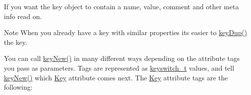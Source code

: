 \begin{DoxyCodeInclude}{0}
\DoxyCodeLine{\textcolor{comment}{// Create and initialize a key with a name and nothing else}}
\DoxyCodeLine{\textcolor{comment}{// work with it}}
\end{DoxyCodeInclude}
 If you want the key object to contain a name, value, comment and other meta info read on.

\begin{DoxyNote}{Note}
When you already have a key with similar properties its easier to \mbox{\hyperlink{group__key_gae6ec6a60cc4b8c1463fa08623d056ce3}{key\+Dup()}} the key.
\end{DoxyNote}
You can call \mbox{\hyperlink{group__key_gad23c65b44bf48d773759e1f9a4d43b89}{key\+New()}} in many different ways depending on the attribute tags you pass as parameters. Tags are represented as \mbox{\hyperlink{group__key_ga91fb3178848bd682000958089abbaf40}{keyswitch\+\_\+t}} values, and tell \mbox{\hyperlink{group__key_gad23c65b44bf48d773759e1f9a4d43b89}{key\+New()}} which \mbox{\hyperlink{classkdb_1_1Key}{Key}} attribute comes next. The \mbox{\hyperlink{classkdb_1_1Key}{Key}} attribute tags are the following\+:
